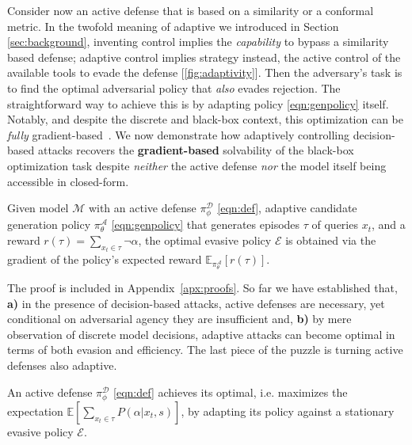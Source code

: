 Consider now an active defense that is based on a similarity or a conformal metric.
In the twofold meaning of adaptive we introduced in Section \ref{sec:background}, inventing control implies the \textit{capability} to bypass a similarity based defense; adaptive control implies strategy instead, the active control of the available tools to evade the defense [\ref{fig:adaptivity}].
Then the adversary's task is to find the optimal adversarial policy that \emph{also} evades rejection.
The straightforward way to achieve this is by adapting policy \eqref{eqn:genpolicy} itself.
Notably, and despite the discrete and black-box context, this optimization can be \emph{fully} gradient-based~\cite{sutton1999policy}.
We now demonstrate how adaptively controlling decision-based attacks recovers the \textbf{gradient-based} solvability of the black-box optimization task despite \emph{neither} the active defense \emph{nor} the model itself being accessible in closed-form.

\begin{theorem}
Given model $\mathcal{M}$ with an active defense $\pi_\phi^{\mathcal{D}}$ \eqref{eqn:def}, adaptive candidate generation policy $\pi_\theta^\mathcal{A}$ \eqref{eqn:genpolicy} that generates episodes $\tau$ of queries $x_t$, and a reward $r(\tau)= \sum_{x_t \in \tau} \neg  \alpha$, the optimal evasive policy $\mathcal{E}$ is obtained via the gradient of the policy's expected reward $\mathbb{E}_{\pi^\mathcal{A}_\theta}[r(\tau)]$.
\label{th:epg}
\end{theorem}

The proof is included in Appendix~\ref{apx:proofs}.
So far we have established that, \textbf{a)} in the presence of decision-based attacks, active defenses are necessary, yet conditional on adversarial agency they are insufficient and, \textbf{b)} by mere observation of discrete model decisions, adaptive attacks can become optimal in terms of both evasion and efficiency.
The last piece of the puzzle is turning active defenses also adaptive.

\begin{proposition}
An active defense $\pi_\phi^{\mathcal{D}}$ \eqref{eqn:def} achieves its optimal, i.e. maximizes the expectation $\mathbb{E}[\sum_{x_t \in \tau}P(\alpha|x_t,s)]$, by adapting its policy against a stationary evasive policy $\mathcal{E}$.
\label{prop:3}
\end{proposition}

